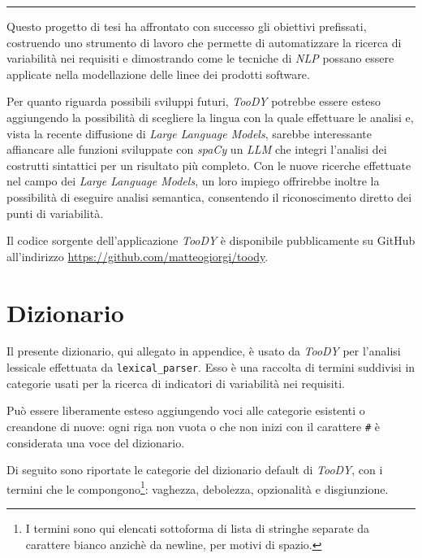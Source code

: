 \documentclass[12pt]{report}
\newcommand{\toody}{\textsl{TooDY}\xspace}
\newcommand{\spacy}{\textsl{spaCy}\xspace}
\newcommand{\nlp}{\textsl{NLP}\xspace}
\begin{document}
{\centering \rule{0.5\linewidth}{0.1pt} \par\vspace{0.25cm}}

Questo progetto di tesi ha affrontato con successo gli obiettivi prefissati, costruendo uno strumento di lavoro che permette di automatizzare la ricerca di variabilità nei requisiti e dimostrando come le tecniche di \nlp possano essere applicate nella modellazione delle linee dei prodotti software.

Per quanto riguarda possibili \textsf{sviluppi futuri}, \toody potrebbe essere esteso aggiungendo la possibilità di scegliere la lingua con la quale effettuare le analisi e, vista la recente diffusione di \textit{Large Language Models}, sarebbe interessante affiancare alle funzioni sviluppate con \spacy un \textsl{LLM} che integri l'analisi dei costrutti sintattici per un risultato più completo. Con le nuove ricerche effettuate nel campo dei \textit{Large Language Models}, un loro impiego offrirebbe inoltre la possibilità di eseguire analisi semantica, consentendo il riconoscimento diretto dei punti di variabilità.


\begin{mdframed}
\small
Il codice sorgente dell'applicazione \toody è disponibile pubblicamente su GitHub all'indirizzo \url{https://github.com/matteogiorgi/toody}.
\end{mdframed}




\nocite{*}
\printbibliography




\appendix
\chapter{Dizionario}
\label{app:dizionario}
Il presente dizionario, qui allegato in appendice, è usato da \toody per l'analisi lessicale effettuata da \texttt{lexical\_parser}. Esso è una raccolta di termini suddivisi in categorie usati per la ricerca di indicatori di variabilità nei requisiti.

Può essere liberamente esteso aggiungendo voci alle categorie esistenti o creandone di nuove: ogni riga non vuota o che non inizi con il carattere \texttt{\#} è considerata una voce del dizionario.

Di seguito sono riportate le categorie del dizionario default di \toody, con i termini che le compongono\footnote{I termini sono qui elencati sottoforma di lista di stringhe separate da carattere bianco anzichè da newline, per motivi di spazio.}: vaghezza, debolezza, opzionalità e disgiunzione.
\end{document}
